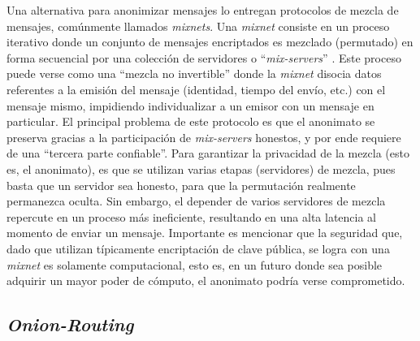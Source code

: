 Una alternativa para anonimizar mensajes lo entregan protocolos de mezcla de 
mensajes, comúnmente llamados \emph{mixnets}. Una \emph{mixnet} consiste en un 
proceso iterativo donde un conjunto de mensajes encriptados es mezclado 
(permutado) en forma secuencial por una colección de servidores o 
``\emph{mix-servers}'' \cite{chaum1981untraceable}. Este proceso puede verse 
como una ``mezcla no invertible'' donde la \emph{mixnet} disocia datos 
referentes a la emisión del mensaje (identidad, tiempo del envío, etc.) con el 
mensaje mismo, impidiendo individualizar a un emisor con un mensaje en 
particular. El principal problema de este protocolo es que el anonimato se 
preserva gracias a la participación de \emph{mix-servers} honestos, y por ende 
requiere de una ``tercera parte confiable''. Para garantizar la privacidad de 
la mezcla (esto es, el anonimato), es que se utilizan varias etapas 
(servidores) de mezcla, pues basta que un servidor sea honesto, para que la 
permutación realmente permanezca oculta. Sin embargo, el depender de varios 
servidores de mezcla repercute en un proceso más ineficiente, resultando en 
una alta latencia al momento de enviar un mensaje. Importante es mencionar que 
la seguridad que, dado que utilizan típicamente encriptación de clave pública, 
se logra con una \emph{mixnet} es solamente computacional, esto es, 
en un futuro donde sea posible adquirir un mayor poder de 
cómputo, el anonimato podría verse comprometido.

\subsection{\emph{Onion-Routing}}

